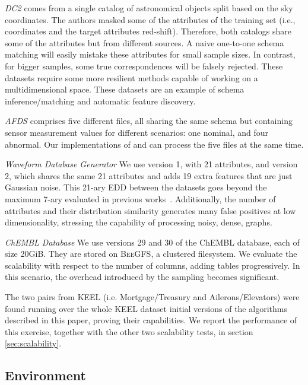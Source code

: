 \emph{DC2} comes from a single catalog of astronomical
    objects split based on the sky coordinates.
    The authors masked some of the attributes of the training set (i.e., coordinates and the
    target attributes red-shift). 
    Therefore, both catalogs share some of the attributes but from different sources.
    A naive one-to-one schema matching will
    easily mistake these attributes for small sample sizes. In contrast, for bigger samples,
    some true correspondences will be falsely rejected.
    These datasets require some more resilient methods capable of working on a
    multidimensional space.
    These datasets are an example of schema inference/matching and automatic feature discovery.
    
\emph{\gls{AFDS}} comprises five different files,
    all sharing the same schema but containing sensor measurement values for different scenarios:
    one nominal, and four abnormal. Our implementations of \Find and \PresQ can process
    the five files at the same time.

\emph{Waveform Database Generator}
    We use version 1, with 21 attributes, and version 2, which shares the same 21 attributes and adds 19
    extra features that are just Gaussian noise. This 21-ary \gls{EDD} between the datasets goes
    beyond the maximum 7-ary evaluated in previous works~\cite{Dursch2019}.
    Additionally, the number of attributes and their distribution similarity generates many false positives at low
    dimensionality, stressing the capability of processing noisy, dense, graphs.

\emph{ChEMBL Database}
    We use versions 29 and 30 of the ChEMBL database, each of size 20GiB. They are
    stored on \textsc{BeeGFS}, a clustered filesystem. We evaluate the scalability with respect to the number of
    columns, adding tables progressively. In this scenario, the overhead introduced by the sampling becomes significant.

The two pairs from KEEL (i.e. Mortgage/Treasury and Ailerons/Elevators) were found
running over the whole KEEL dataset initial versions of the algorithms described in
this paper, proving their capabilities. We report the performance of this exercise, together
with the other two scalability tests, in section \ref{sec:scalability}.

\subsection{Environment}

